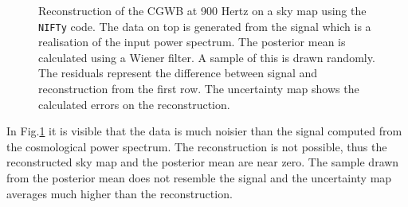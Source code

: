 \begin{figure}[h]
    \centering
    \newline
    \vspace{-1.5cm}
    \caption[Reconstruction of the CGWB at 900 Hertz on a sky map using the {\tt NIFTy} code.]{Reconstruction of the CGWB at 900 Hertz on a sky map using the {\tt NIFTy} code. The data on top is generated from the signal which is a realisation of the input power spectrum. The posterior mean is calculated using a Wiener filter. A sample of this is drawn randomly. The residuals represent the difference between signal and reconstruction from the first row. The uncertainty map shows the calculated errors on the reconstruction.}
    \label{sky_maps_cosmo}
\end{figure}

In Fig.\ref{sky_maps_cosmo} it is visible that the data is much noisier than the signal computed from the cosmological power spectrum. The reconstruction is not possible, thus the reconstructed sky map and the posterior mean are near zero. The sample drawn from the posterior mean does not resemble the signal and the uncertainty map averages much higher than the reconstruction. 

